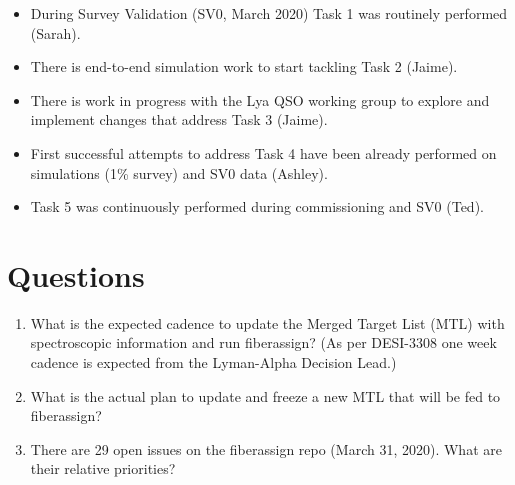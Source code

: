 \documentclass{article}
\begin{document}
\begin{itemize}
\item During Survey Validation (SV0, March 2020) Task 1 was routinely performed (Sarah).

\item There is end-to-end simulation work to start tackling Task 2 (Jaime).

\item There is work in progress with the Lya QSO working group to explore and implement changes that address Task 3 (Jaime).

\item First successful attempts to address Task 4 have been already performed on simulations (1\% survey) and SV0 data (Ashley). 

\item Task 5 was continuously performed during commissioning and SV0 (Ted). 
\end{itemize}
 
\section{Questions}

\begin{enumerate}
\item What is the expected cadence to update the Merged Target List
  (MTL) with spectroscopic information and run fiberassign? (As per
  DESI-3308 one week cadence is expected from the Lyman-Alpha Decision
  Lead.) 
\item What is the actual plan to update and freeze a new MTL that
  will be fed to fiberassign?
\item There are 29 open issues on the fiberassign repo (March 31,
  2020). What are their relative priorities?
\end{enumerate}
\end{document}
